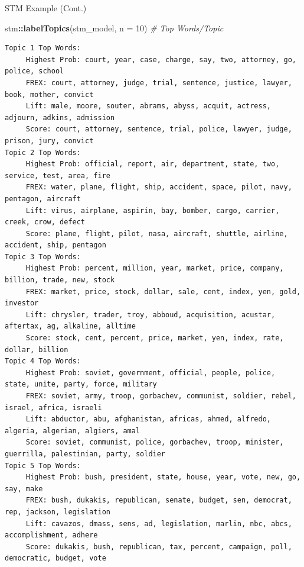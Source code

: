 \documentclass[
  ignorenonframetext,
  aspectratio=169]{beamer}
\newenvironment{Shaded}{\begin{snugshade}}{\end{snugshade}}
\newcommand{\AttributeTok}[1]{\textcolor[rgb]{0.13,0.29,0.53}{#1}}
\newcommand{\CommentTok}[1]{\textcolor[rgb]{0.56,0.35,0.01}{\textit{#1}}}
\newcommand{\DecValTok}[1]{\textcolor[rgb]{0.00,0.00,0.81}{#1}}
\newcommand{\FunctionTok}[1]{\textcolor[rgb]{0.13,0.29,0.53}{\textbf{#1}}}
\newcommand{\NormalTok}[1]{#1}
\newcommand{\SpecialCharTok}[1]{\textcolor[rgb]{0.81,0.36,0.00}{\textbf{#1}}}
\begin{document}
\begin{frame}[fragile]{STM Example (Cont.)}
\label{stm-example-cont.}
\scriptsize

\begin{Shaded}
\begin{Highlighting}[]
\NormalTok{stm}\SpecialCharTok{::}\FunctionTok{labelTopics}\NormalTok{(stm\_model, }\AttributeTok{n =} \DecValTok{10}\NormalTok{) }\CommentTok{\# Top Words/Topic}
\end{Highlighting}
\end{Shaded}

\begin{verbatim}
Topic 1 Top Words:
     Highest Prob: court, year, case, charge, say, two, attorney, go, police, school 
     FREX: court, attorney, judge, trial, sentence, justice, lawyer, book, mother, convict 
     Lift: male, moore, souter, abrams, abyss, acquit, actress, adjourn, adkins, admission 
     Score: court, attorney, sentence, trial, police, lawyer, judge, prison, jury, convict 
Topic 2 Top Words:
     Highest Prob: official, report, air, department, state, two, service, test, area, fire 
     FREX: water, plane, flight, ship, accident, space, pilot, navy, pentagon, aircraft 
     Lift: virus, airplane, aspirin, bay, bomber, cargo, carrier, creek, crow, defect 
     Score: plane, flight, pilot, nasa, aircraft, shuttle, airline, accident, ship, pentagon 
Topic 3 Top Words:
     Highest Prob: percent, million, year, market, price, company, billion, trade, new, stock 
     FREX: market, price, stock, dollar, sale, cent, index, yen, gold, investor 
     Lift: chrysler, trader, troy, abboud, acquisition, acustar, aftertax, ag, alkaline, alltime 
     Score: stock, cent, percent, price, market, yen, index, rate, dollar, billion 
Topic 4 Top Words:
     Highest Prob: soviet, government, official, people, police, state, unite, party, force, military 
     FREX: soviet, army, troop, gorbachev, communist, soldier, rebel, israel, africa, israeli 
     Lift: abductor, abu, afghanistan, africas, ahmed, alfredo, algeria, algerian, algiers, amal 
     Score: soviet, communist, police, gorbachev, troop, minister, guerrilla, palestinian, party, soldier 
Topic 5 Top Words:
     Highest Prob: bush, president, state, house, year, vote, new, go, say, make 
     FREX: bush, dukakis, republican, senate, budget, sen, democrat, rep, jackson, legislation 
     Lift: cavazos, dmass, sens, ad, legislation, marlin, nbc, abcs, accomplishment, adhere 
     Score: dukakis, bush, republican, tax, percent, campaign, poll, democratic, budget, vote 
\end{verbatim}


\end{frame}
\end{document}
